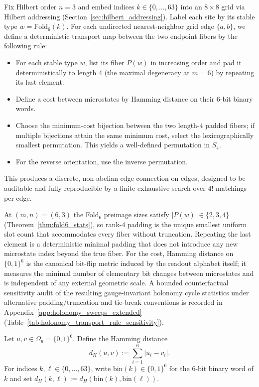 Fix Hilbert order $n=3$ and embed indices $k\in\{0,\dots,63\}$ into an $8\times 8$ grid via Hilbert addressing (Section~\ref{sec:hilbert_addressing}).
Label each site by its stable type $w=\mathrm{Fold}_6(k)$.
For each undirected nearest-neighbor grid edge $\{a,b\}$, we define a deterministic transport map between the two endpoint fibers by the following rule:
\begin{itemize}
\item For each stable type $w$, list its fiber $P(w)$ in increasing order and pad it deterministically to length $4$ (the maximal degeneracy at $m=6$) by repeating its last element.
\item Define a cost between microstates by Hamming distance on their $6$-bit binary words.
\item Choose the minimum-cost bijection between the two length-$4$ padded fibers; if multiple bijections attain the same minimum cost, select the lexicographically smallest permutation. This yields a well-defined permutation in $S_4$.
\item For the reverse orientation, use the inverse permutation.
\end{itemize}
This produces a discrete, non-abelian edge connection on edges, designed to be auditable and fully reproducible by a finite exhaustive search over $4!$ matchings per edge.

\begin{remark}\label{rem:pad4_hamming_rationale}
At $(m,n)=(6,3)$ the Fold$_6$ preimage sizes satisfy $|P(w)|\in\{2,3,4\}$ (Theorem~\ref{thm:fold6_stats}), so rank-$4$ padding is the unique smallest uniform slot count that accommodates every fiber without truncation.
Repeating the last element is a deterministic minimal padding that does not introduce any new microstate index beyond the true fiber.
For the cost, Hamming distance on $\{0,1\}^6$ is the canonical bit-flip metric induced by the readout alphabet itself; it measures the minimal number of elementary bit changes between microstates and is independent of any external geometric scale.
\AuditTag A bounded counterfactual sensitivity audit of the resulting gauge-invariant holonomy cycle statistics under alternative padding/truncation and tie-break conventions is recorded in Appendix~\ref{app:holonomy_sweeps_extended} (Table~\ref{tab:holonomy_transport_rule_sensitivity}).
\end{remark}

\begin{definition}\label{def:hamming_microstates}
Let $u,v\in\Omega_6=\{0,1\}^6$.
Define the Hamming distance
\[
d_H(u,v):=\sum_{i=1}^{6} |u_i-v_i|.
\]
For indices $k,\ell\in\{0,\dots,63\}$, write $\mathrm{bin}(k)\in\{0,1\}^6$ for the $6$-bit binary word of $k$ and set $d_H(k,\ell):=d_H(\mathrm{bin}(k),\mathrm{bin}(\ell))$.
\end{definition}


